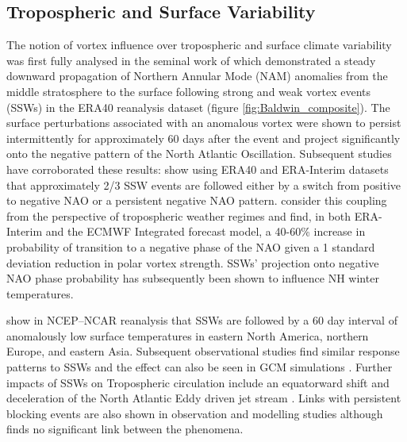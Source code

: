 \subsection{Tropospheric and Surface Variability}
The notion of vortex influence over tropospheric and surface climate variability was first fully analysed in the seminal work of \cite{baldwinStratospheric2001a} which demonstrated a steady downward propagation of Northern Annular Mode (NAM) anomalies from the middle stratosphere to the surface following strong and weak vortex events (SSWs) in the ERA40 reanalysis dataset (figure \ref{fig:Baldwin_composite}). The surface perturbations associated with an anomalous vortex were shown to persist intermittently for approximately 60 days after the event and project significantly onto the negative pattern of the North Atlantic Oscillation. Subsequent studies have corroborated these results: \cite{domeisenEstimating2019} show using ERA40 and ERA-Interim datasets that approximately 2/3 SSW events are followed either by a switch from positive to negative NAO or a persistent negative NAO pattern. \cite{charlton-perezInfluence2018a} consider this coupling from the perspective of tropospheric weather regimes and find, in both ERA-Interim and the ECMWF Integrated forecast model, a 40-60\% increase in probability of transition to a negative phase of the NAO given a 1 standard deviation reduction in polar vortex strength. SSWs' projection onto negative NAO phase probability has subsequently been shown to influence NH winter temperatures.

\cite{thompsonStratospheric2002} show in NCEP–NCAR reanalysis that SSWs are followed by a 60 day interval of anomalously low surface temperatures in eastern North America, northern Europe, and eastern Asia. Subsequent observational studies find similar response patterns to SSWs \citep{kolstadAssociation2010, kingObserved2019, lehtonenObserved2016} and the effect can also be seen in GCM simulations \citep{tomassiniRole2012, lehtonenObserved2016}. Further impacts of SSWs on Tropospheric circulation include an equatorward shift and deceleration of the North Atlantic Eddy driven jet stream \citep{hitchcockDownward2014,maycockRegime2020}. Links with persistent blocking events are also shown in observation and modelling studies \citep{daviniBlocking2014, vialSudden2013} although \cite{taguchiThere2008} finds no significant link between the phenomena.

